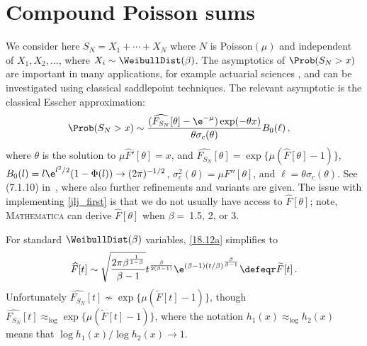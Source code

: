 \section{Compound Poisson sums}\label{S:CompP}
 We  consider here $S_N=X_1+\cdots+X_N$ where
$N$ is Poisson$(\mu)$ and independent of $X_1,X_2,\ldots$, where $X_i \sim \WeibullDist(\beta)$. The asymptotics of
$\Prob(S_N>x)$ are important in many applications, for example actuarial sciences \cite{asmussen2010ruin}, and can be investigated using classical saddlepoint techniques. The relevant asymptotic is the classical Esscher approximation:
\begin{align}
	\Prob(S_N > x)
	&\sim \frac{
		( \widehat{F_{S_N}}[\theta] - \e^{-\mu} ) \exp( {-}\theta x )
	}{
		\theta \sigma_c(\theta)
	} B_0(\ell)  \label{jlj_first}  \,,
\end{align}
where $\theta$ is the solution to $\mu \widehat{F}'[\theta] = x$, and $\widehat{F_{S_N}}[\theta] = \exp \{ \mu (\widehat{F}[\theta] - 1 ) \}$,
$B_0(l) = l \e^{l^2/2}(1 - \Phi(l)) \to (2\pi)^{-1/2}$, $\sigma_c^2(\theta)= \mu F''[\theta]$, and $\ell = \theta \sigma_c(\theta)$. See (7.1.10) in~\cite{jensen1995saddlepoint},
where also further
refinements and variants are given. The issue with implementing \eqref{jlj_first} is that we do not usually have access to $\widehat{F}[\theta]$; note, \textsc{Mathematica} can derive $\widehat{F}[\theta]$ when $\beta =\ $1.5, 2, or 3.

For standard $\WeibullDist(\beta)$ variables, \eqref{18.12a} simplifies to%
\begin{align*}
\widehat{F}[t] \sim \sqrt{\frac{2 \pi \beta ^{\frac{1}{1-\beta }}}{\beta -1}}  t^{\frac{\beta}{2(\beta-1)}} \e^{(\beta -1) (t/\beta)^{\frac{\beta }{\beta -1}}} \defeqr \widetilde{F}[t]\,.
\end{align*}
Unfortunately $\widehat{F_{S_N}}[t] \not\sim \exp\{\mu( \widetilde{F}[t] - 1)\}$, though $\widehat{F_{S_N}}[t] \approx_{\log} \exp\{\mu( \widetilde{F}[t] - 1)\}$, where the notation $h_1(x)\approx_{\log}h_2(x)$ means that $\log h_1(x)/\log h_2(x)\to 1$.

